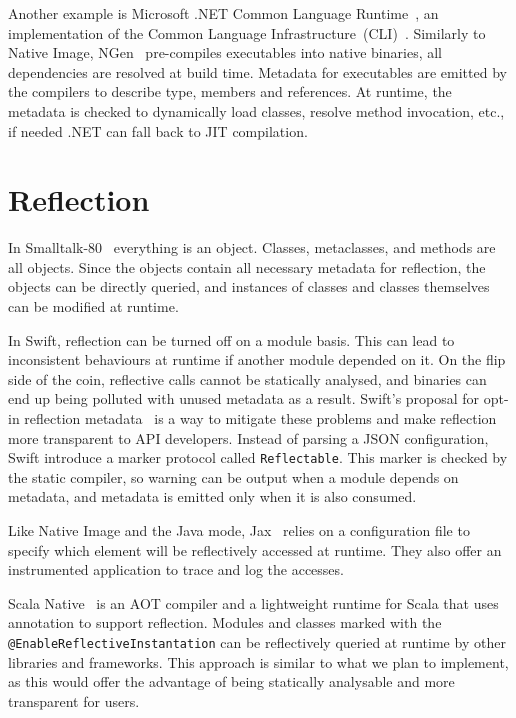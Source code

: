 Another example is Microsoft .NET Common Language Runtime~\cite{noauthor_common_2023}, an implementation of the Common Language Infrastructure~(CLI)~\cite{noauthor_common_2012}. 
Similarly to Native Image, NGen~\cite{noauthor_clr_2019} pre-compiles executables 
into native binaries, all dependencies are resolved at build time.
Metadata for executables are emitted by the compilers to describe type, members and references. At runtime, the metadata is checked to dynamically load classes, resolve method invocation, etc., if needed .NET can fall back to JIT compilation.

\section{Reflection}
In Smalltalk-80~\cite{goldberg_smalltalk-80_1983} everything is an object. Classes, metaclasses, and methods are all objects. Since the objects contain all necessary metadata for reflection, the objects can be directly queried, and instances of classes and classes themselves can be modified at runtime. 

In Swift, reflection can be turned off on a module basis. This can lead to inconsistent behaviours at runtime 
if another module depended on it. On the flip side of the coin, reflective calls cannot be statically analysed, and binaries can end up being polluted with unused metadata as a result.
Swift's proposal for opt-in reflection metadata~\cite{noauthor_pitch_2022} is a way to mitigate these problems and make reflection more transparent to API developers.
Instead of parsing a JSON configuration, Swift introduce a marker protocol called \verb|Reflectable|. This marker is checked by the static compiler, so warning can be output when a module depends on metadata, and metadata is emitted only when it is also consumed.

Like Native Image and the Java mode, Jax~\cite{tip_practical_1999} relies on a configuration file to specify which element will be reflectively accessed at runtime. They also offer an instrumented application to trace and log the accesses.

Scala Native~\cite{noauthor_scala_nodate} is an AOT compiler and a lightweight runtime for Scala that uses annotation to support reflection. Modules and classes marked with the \verb|@EnableReflectiveInstantation| can be reflectively queried at runtime by other libraries and frameworks.
This approach is similar to what we plan to implement, as this would offer the advantage of being statically analysable and more transparent for users.

